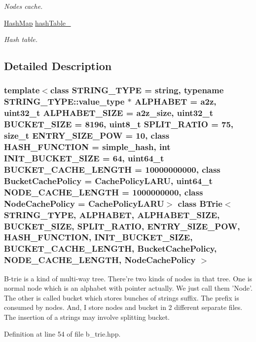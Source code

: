 \begin{CompactItemize}
\begin{CompactList}\small\item\em Nodes cache. \item\end{CompactList}\item 
\hypertarget{classBTrie_99d0b0d47787e8b38e610f096d51e054}{
\hyperlink{classMap}{HashMap} \hyperlink{classBTrie_99d0b0d47787e8b38e610f096d51e054}{hashTable\_\-}}
\label{classBTrie_99d0b0d47787e8b38e610f096d51e054}

\begin{CompactList}\small\item\em Hash table. \item\end{CompactList}\end{CompactItemize}


\subsection{Detailed Description}
\subsubsection*{template$<$class STRING\_\-TYPE = string, typename STRING\_\-TYPE::value\_\-type $\ast$ ALPHABET = a2z, uint32\_\-t ALPHABET\_\-SIZE = a2z\_\-size, uint32\_\-t BUCKET\_\-SIZE = 8196, uint8\_\-t SPLIT\_\-RATIO = 75, size\_\-t ENTRY\_\-SIZE\_\-POW = 10, class HASH\_\-FUNCTION = simple\_\-hash, int INIT\_\-BUCKET\_\-SIZE = 64, uint64\_\-t BUCKET\_\-CACHE\_\-LENGTH = 10000000000, class BucketCachePolicy = CachePolicyLARU, uint64\_\-t NODE\_\-CACHE\_\-LENGTH = 1000000000, class NodeCachePolicy = CachePolicyLARU$>$ class BTrie$<$ STRING\_\-TYPE, ALPHABET, ALPHABET\_\-SIZE, BUCKET\_\-SIZE, SPLIT\_\-RATIO, ENTRY\_\-SIZE\_\-POW, HASH\_\-FUNCTION, INIT\_\-BUCKET\_\-SIZE, BUCKET\_\-CACHE\_\-LENGTH, BucketCachePolicy, NODE\_\-CACHE\_\-LENGTH, NodeCachePolicy $>$}

B-trie is a kind of multi-way tree. There’re two kinds of nodes in that tree. One is normal node which is an alphabet with pointer actually. We just call them ’Node’. The other is called bucket which stores bunches of strings suffix. The prefix is consumed by nodes. And, I store nodes and bucket in 2 different separate files. The insertion of a strings may involve splitting bucket. 

Definition at line 54 of file b\_\-trie.hpp.

